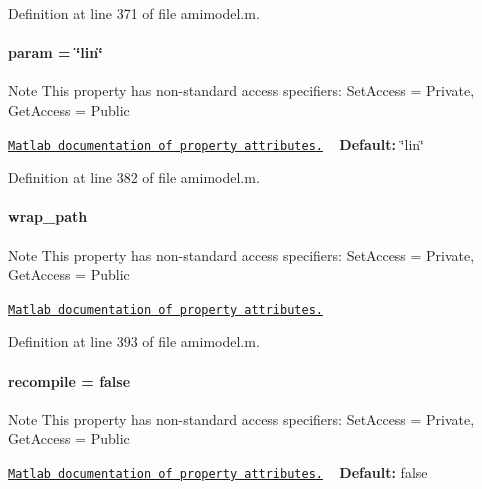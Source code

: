 Definition at line 371 of file amimodel.\+m.

\hypertarget{classamimodel_a51f20d6b1b54a2eee3be0e8adc96a0ae}{}
\paragraph[{param}]{\setlength{\rightskip}{0pt plus 5cm}param = \char`\"{}lin\char`\"{}}\label{classamimodel_a51f20d6b1b54a2eee3be0e8adc96a0ae}
\begin{DoxyNote}{Note}
This property has non-\/standard access specifiers\+: {\ttfamily Set\+Access = Private, Get\+Access = Public} 

\href{http://www.mathworks.com/help/matlab/matlab_oop/property-attributes.html}{\tt Matlab documentation of property attributes.} ~\newline
{\bfseries Default\+:} \char`\"{}lin\char`\"{} 
\end{DoxyNote}


Definition at line 382 of file amimodel.\+m.

\hypertarget{classamimodel_a0b316a20054ba282555674d939a82406}{}
\paragraph[{wrap\+\_\+path}]{\setlength{\rightskip}{0pt plus 5cm}wrap\+\_\+path}\label{classamimodel_a0b316a20054ba282555674d939a82406}
\begin{DoxyNote}{Note}
This property has non-\/standard access specifiers\+: {\ttfamily Set\+Access = Private, Get\+Access = Public} 

\href{http://www.mathworks.com/help/matlab/matlab_oop/property-attributes.html}{\tt Matlab documentation of property attributes.} 
\end{DoxyNote}


Definition at line 393 of file amimodel.\+m.

\hypertarget{classamimodel_a8d2e824e03e32034b634a7c48f2a26c6}{}
\paragraph[{recompile}]{\setlength{\rightskip}{0pt plus 5cm}recompile = false}\label{classamimodel_a8d2e824e03e32034b634a7c48f2a26c6}
\begin{DoxyNote}{Note}
This property has non-\/standard access specifiers\+: {\ttfamily Set\+Access = Private, Get\+Access = Public} 

\href{http://www.mathworks.com/help/matlab/matlab_oop/property-attributes.html}{\tt Matlab documentation of property attributes.} ~\newline
{\bfseries Default\+:} false 
\end{DoxyNote}


